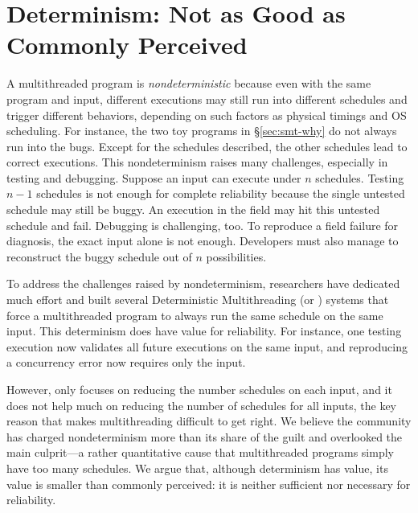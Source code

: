 


\section{Determinism: Not as Good as Commonly Perceived} \label{sec:smt-dmt}

A multithreaded program is \emph{nondeterministic} because even with the same
program and input, different executions may still run into different schedules
and trigger different behaviors, depending on such factors as physical timings
and OS scheduling. For instance, the two toy programs in \S\ref{sec:smt-why}
do not always run into the bugs.  Except for the schedules described, the
other schedules lead to correct executions. This nondeterminism raises many
challenges, especially in testing and debugging.  Suppose an input can execute
under $n$ schedules. Testing $n-1$ schedules is not enough for complete
reliability because the single untested schedule may still be buggy.  An
execution in the field may hit this untested schedule and fail.  Debugging is
challenging, too. To reproduce a field failure for diagnosis, the exact input
alone is not enough. Developers must also manage to reconstruct the buggy
schedule out of $n$ possibilities.

To address the challenges raised by nondeterminism, researchers have dedicated
much effort and built several Deterministic Multithreading (or \dmt) systems
that force a multithreaded program to always run the same schedule on the same
input.  This determinism does have value for reliability.  For instance, one
testing execution now validates all future executions on the same input, and 
reproducing a concurrency error now requires only the input.

However, \dmt only focuses on reducing the number schedules on each input, and
it does not help much on reducing the number of schedules for all inputs, the
key reason that makes multithreading difficult to get right.  We believe the
community has charged nondeterminism more
than its share of the guilt and overlooked the main culprit---a rather
quantitative cause that multithreaded programs simply have too many schedules.
We argue that, although determinism has value, its value is smaller than
commonly perceived: it is neither sufficient nor necessary for reliability.

